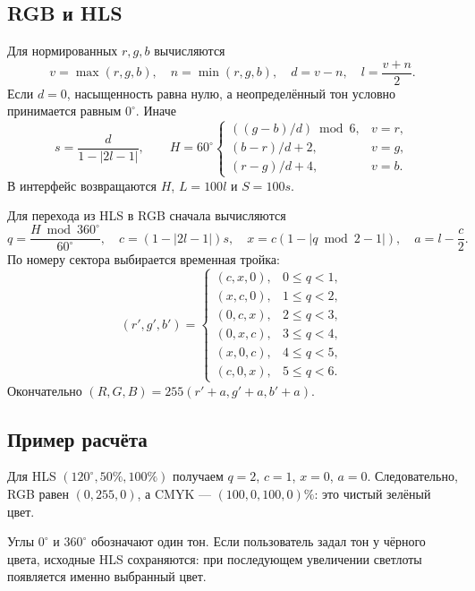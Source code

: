 \documentclass[12pt,a4paper]{extarticle}
\begin{document}
\clearpage
\subsection{RGB и HLS}
Для нормированных $r,g,b$ вычисляются
\begin{equation}
 v=\max(r,g,b),\quad n=\min(r,g,b),\quad d=v-n,\quad l=\frac{v+n}{2}.
\end{equation}
Если $d=0$, насыщенность равна нулю, а неопределённый тон условно принимается равным $0^\circ$. Иначе
\begin{equation}
 s=\frac{d}{1-|2l-1|},\qquad
 H=60^\circ\begin{cases}
 ((g-b)/d)\bmod 6,&v=r,\\
 (b-r)/d+2,&v=g,\\
 (r-g)/d+4,&v=b.
 \end{cases}
\end{equation}
В интерфейс возвращаются $H$, $L=100l$ и $S=100s$.

Для перехода из HLS в RGB сначала вычисляются
\begin{equation}
 q=\frac{H\bmod360^\circ}{60^\circ},\quad
 c=(1-|2l-1|)s,\quad x=c(1-|q\bmod2-1|),\quad a=l-\frac{c}{2}.
\end{equation}
По номеру сектора выбирается временная тройка:
\begin{equation}
 (r',g',b')=\begin{cases}
 (c,x,0),&0\le q<1,\\
 (x,c,0),&1\le q<2,\\
 (0,c,x),&2\le q<3,\\
 (0,x,c),&3\le q<4,\\
 (x,0,c),&4\le q<5,\\
 (c,0,x),&5\le q<6.
 \end{cases}
\end{equation}
Окончательно $(R,G,B)=255(r'+a,g'+a,b'+a)$.

\subsection*{Пример расчёта}
Для HLS $(120^\circ,50\%,100\%)$ получаем $q=2$, $c=1$, $x=0$, $a=0$. Следовательно, RGB равен $(0,255,0)$, а CMYK --- $(100,0,100,0)\%$: это чистый зелёный цвет.

Углы $0^\circ$ и $360^\circ$ обозначают один тон. Если пользователь задал тон у чёрного цвета, исходные HLS сохраняются: при последующем увеличении светлоты появляется именно выбранный цвет.

\clearpage
\end{document}
